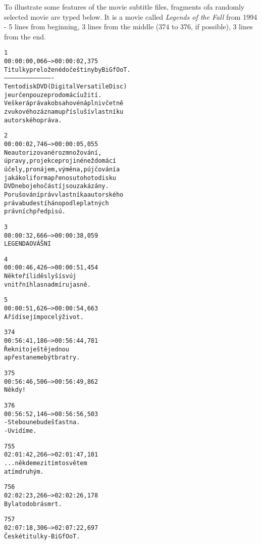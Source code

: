 To illustrate some features of the movie subtitle files, fragments ofa randomly selected movie are typed below. It is a movie called \emph{Legends of the Fall} from 1994 - 5 lines from beginning, 3 lines from the middle (374 to 376, if possible), 3 lines from the end.
 

\newenvironment{subexam}{\begin{boxedminipage}[b]{0.4\textwidth}
\footnotesize
\begin{alltt}
}
{
\end{alltt}
\end{boxedminipage}}



\begin{subexam}
1
00:00:00,066 --> 00:00:02,375
Titulky preložené do češtiny by BiGfOoT.
----------------------------------------
Tento disk DVD (Digital Versatile Disc)
je určen pouze pro domácí užití.
Veškerá práva k obsahové náplni včetně
zvukového záznamu přísluší vlastníku
autorského práva.

2
00:00:02,746 --> 00:00:05,055
Neautorizované rozmnožování,
úpravy, projekce pro jiné než domácí
účely, pronájem, výměna, pújčování a
jakákoli forma přenosu tohoto disku
DVD nebo jeho částí jsou zakázány.
Porušování práv vlastníka autorského
práva bude stíháno podle platných
právních předpisú.

3
00:00:32,666 --> 00:00:38,059
LEGENDA O VÁŠNI

4
00:00:46,426 --> 00:00:51,454
Někteří lidě slyší svúj
vnitřní hlas nadmíru jasně.

5
00:00:51,626 --> 00:00:54,663
A řídí se jím po celý život.

374
00:56:41,186 --> 00:56:44,781
Řekni to ještě jednou
a přestaneme být bratry.

375
00:56:46,506 --> 00:56:49,862
Někdy!

376
00:56:52,146 --> 00:56:56,503
- S tebou nebude šťastna.
- Uvidíme.

755
02:01:42,266 --> 02:01:47,101
... někde mezi tímto světem
a tím druhým.

756
02:02:23,266 --> 02:02:26,178
Byla to dobrá smrt.

757
02:07:18,306 --> 02:07:22,697
České titulky - BiGfOoT.
\end{subexam}
\hspace{0.5cm}
